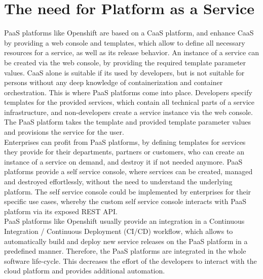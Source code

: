 \section{The need for Platform as a Service}
\label{sec:paas-need-for-paas}
PaaS platforms like Openshift are based on a CaaS platform, and enhance CaaS by providing a web console and templates, which allow to define all necessary resources for a service, as well as its release behavior. An instance of a service can be created via the web console, by providing the required template parameter values. CaaS alone is suitable if its used by developers, but is not suitable for persons without any deep knowledge of containerization and container orchestration. This is where PaaS platforms come into place. Developers specify templates for the provided services, which contain all technical parts of a service infrastructure, and non-developers create a service instance via the web console. The PaaS platform takes the template and provided template parameter values and provisions the service for the user. \\

Enterprises can profit from PaaS platforms, by defining templates for services they provide for their departments, partners or customers, who can create an instance of a service on demand, and destroy it if not needed anymore. PaaS platforms provide a self service console, where services can be created, managed and destroyed effortlessly, without the need to understand the underlying platform. The self service console could be implemented by enterprises for their specific use cases, whereby the custom self service console interacts with PaaS platform via its exposed REST API. \\

PaaS platforms like Openshift usually provide an integration in a Continuous Integration / Continuous Deployment (CI/CD) workflow, which allows to automatically build and deploy new service releases on the PaaS platform in a predefined manner. Therefore, the PaaS platforms are integrated in the whole software life-cycle. This decreases the effort of the developers to interact with the cloud platform and provides additional automation.
 
